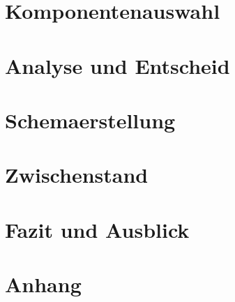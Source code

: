 \documentclass[]{article}
\begin{document}
\section{Komponentenauswahl}
\section{Analyse und Entscheid}

\section{Schemaerstellung}

\section{Zwischenstand}

\section{Fazit und Ausblick}

%

\section{Anhang}
\end{document}
